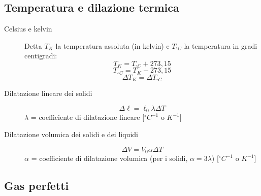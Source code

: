 \documentclass[a4paper,11pt,italian]{article}
\begin{document}
\subsection{Temperatura e dilazione termica}

\begin{description}
  \item[Celsius e kelvin]
  Detta $ T_K $ la temperatura assoluta (in kelvin) e $ T_{^{\circ}C} $ la temperatura in gradi centigradi:
  \[ T_K = T_{^{\circ}C} + 273,15 \]
  \[ T_{{\circ}C} = T_{K} - 273,15 \]
  \[ \Delta T_K = \Delta T_{^{\circ}C} \]
  
  \item[Dilatazione lineare dei solidi] 
  \[ \Delta \ell = \ell_0 \lambda \Delta T \] 
  $ \lambda $ = coefficiente di dilatazione lineare [$ ^{\circ}C^{-1} $ o $ K^{-1} $]
  
  \item[Dilatazione volumica dei solidi e dei liquidi] 
  \[ \Delta V = V_0 \alpha \Delta T \] 
  $ \alpha $ = coefficiente di dilatazione volumica (per i solidi, $ \alpha = 3 \lambda $) [$ ^{\circ}C^{-1} $ o $ K^{-1} $]
\end{description}

\subsection{Gas perfetti}
\end{document}
